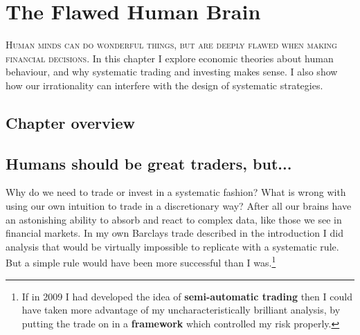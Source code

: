 \chapter{The Flawed Human Brain}

\noindent\textsc{Human minds can do wonderful things, but are deeply flawed when making financial decisions.} In this chapter I explore economic theories about human behaviour, and why systematic trading and investing makes sense. I also show how our irrationality can interfere with the design of systematic strategies.

\section*{Chapter overview}  {}

\begin{chapteroverviewtable}
\end{chapteroverviewtable}

\section*{Humans should be great traders, but...}  {}

Why do we need to trade or invest in a systematic fashion? What is wrong with using our own intuition to trade in a discretionary way? After all our brains have an astonishing ability to absorb and react to complex data, like those we see in financial markets. In my own Barclays trade described in the introduction I did analysis that would be virtually impossible to replicate with a systematic rule. But a simple rule would have been more successful than I was.\footnote{If in 2009 I had developed the idea of \textbf{semi-automatic trading} then I could have taken more advantage of my uncharacteristically brilliant analysis, by putting the trade on in a \textbf{framework} which controlled my risk properly.}

